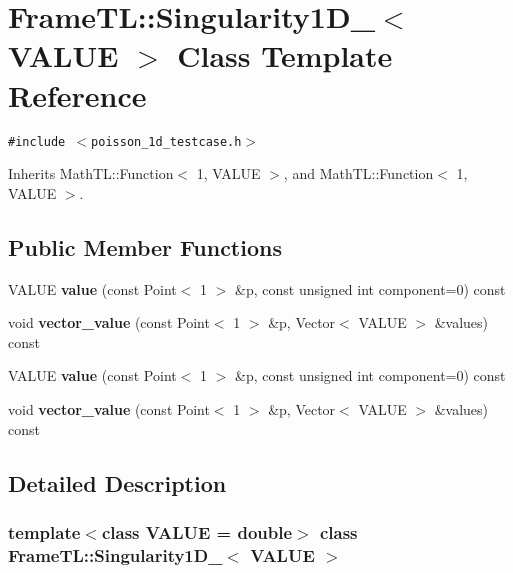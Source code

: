 \hypertarget{classFrameTL_1_1Singularity1D__2}{
\section{FrameTL::Singularity1D\_$<$ VALUE $>$ Class Template Reference}
\label{classFrameTL_1_1Singularity1D__2}
}
{\tt \#include $<$poisson\_\-1d\_\-testcase.h$>$}

Inherits MathTL::Function$<$ 1, VALUE $>$, and MathTL::Function$<$ 1, VALUE $>$.

\subsection*{Public Member Functions}
\begin{CompactItemize}
\item 
\hypertarget{classFrameTL_1_1Singularity1D__2_237ffe6850861b676d201535dcc188a9}{
VALUE \textbf{value} (const Point$<$ 1 $>$ \&p, const unsigned int component=0) const }
\label{classFrameTL_1_1Singularity1D__2_237ffe6850861b676d201535dcc188a9}

\item 
\hypertarget{classFrameTL_1_1Singularity1D__2_b3b29b6a43794f818d2765a68e32e79e}{
void \textbf{vector\_\-value} (const Point$<$ 1 $>$ \&p, Vector$<$ VALUE $>$ \&values) const }
\label{classFrameTL_1_1Singularity1D__2_b3b29b6a43794f818d2765a68e32e79e}

\item 
\hypertarget{classFrameTL_1_1Singularity1D__2_237ffe6850861b676d201535dcc188a9}{
VALUE \textbf{value} (const Point$<$ 1 $>$ \&p, const unsigned int component=0) const }
\label{classFrameTL_1_1Singularity1D__2_237ffe6850861b676d201535dcc188a9}

\item 
\hypertarget{classFrameTL_1_1Singularity1D__2_b3b29b6a43794f818d2765a68e32e79e}{
void \textbf{vector\_\-value} (const Point$<$ 1 $>$ \&p, Vector$<$ VALUE $>$ \&values) const }
\label{classFrameTL_1_1Singularity1D__2_b3b29b6a43794f818d2765a68e32e79e}

\end{CompactItemize}


\subsection{Detailed Description}
\subsubsection*{template$<$class VALUE = double$>$ class FrameTL::Singularity1D\_$<$ VALUE $>$}

